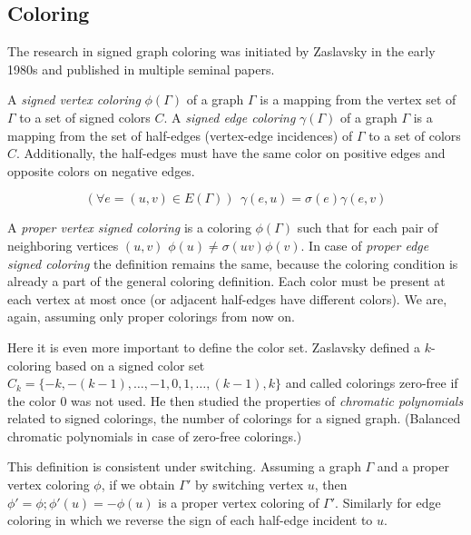 \subsection{Coloring}

The research in signed graph coloring was initiated by Zaslavsky\cite{zaslavsky-graphs} in the early 1980s and published in multiple seminal papers\cite{zaslavsky-invariants,zaslavsky-coloring,zaslavsky-colorful}.

\begin{definition}
    A \textit{signed vertex coloring} $\phi(\Gamma)$ of a graph $\Gamma$ is a mapping from the vertex set of $\Gamma$ to a set of signed colors $C$. A \textit{signed edge coloring} $\gamma(\Gamma)$ of a graph $\Gamma$ is a mapping from the set of half-edges (vertex-edge incidences) of $\Gamma$ to a set of colors $C$. Additionally, the half-edges must have the same color on positive edges and opposite colors on negative edges.

    $$(\forall e = (u,v) \in E(\Gamma))~~ \gamma(e, u) = \sigma(e)\gamma(e, v)$$
\end{definition}

\begin{definition}
    A \textit{proper vertex signed coloring} is a coloring $\phi(\Gamma)$ such that for each pair of neighboring vertices $(u,v)$ $\phi(u) \neq \sigma(uv)\phi(v)$. In case of \textit{proper edge signed coloring} the definition remains the same, because the coloring condition is already a part of the general coloring definition. Each color must be present at each vertex at most once (or adjacent half-edges have different colors). We are, again, assuming only proper colorings from now on.
\end{definition}

Here it is even more important to define the color set. Zaslavsky\cite{zaslavsky-coloring} defined a $k$-coloring based on a signed color set $C_k = \{-k, -(k-1), \dots, -1, 0, 1, \dots, (k-1), k\}$ and called colorings zero-free if the color $0$ was not used. He then studied the properties of \textit{chromatic polynomials} related to signed colorings, the number of colorings for a signed graph. (Balanced chromatic polynomials in case of zero-free colorings.)

This definition is consistent under switching. Assuming a graph $\Gamma$ and a proper vertex coloring $\phi$, if we obtain $\Gamma'$ by switching vertex $u$, then $\phi' = \phi; \phi'(u) = -\phi(u)$ is a proper vertex coloring of $\Gamma'$. Similarly for edge coloring in which we reverse the sign of each half-edge incident to $u$.

